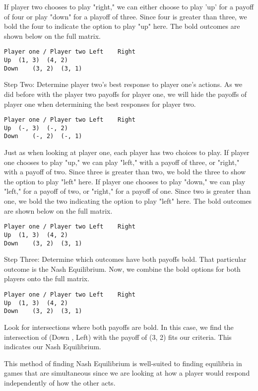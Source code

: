 \documentclass[11pt]{article} %
\begin{document}
\smallskip

If player two chooses to play "right," we can either choose to play 'up' for a payoff of four or play "down" for a playoff of three. Since four is greater than three, we bold the four to indicate the option to play "up" here. The bold outcomes are shown below on the full matrix.
\begin{verbatim}
Player one / Player two	Left	Right
Up	(1, 3)	(4, 2)
Down	(3, 2)	(3, 1)
\end{verbatim}
Step Two: Determine player two's best response to player one's actions.
As we did before with the player two payoffs for player one, we will hide the payoffs of player one when determining the best responses for player two. 
\begin{verbatim}
Player one / Player two	Left	Right
Up	(-, 3)	(-, 2)
Down	(-, 2)	(-, 1)
\end{verbatim}
Just as when looking at player one, each player has two choices to play. If player one chooses to play "up," we can play "left," with a payoff of three, or "right," with a payoff of two. Since three is greater than two, we bold the three to show the option to play "left" here. If player one chooses to play "down," we can play "left," for a payoff of two, or "right," for a payoff of one. Since two is greater than one, we bold the two indicating the option to play "left" here. The bold outcomes are shown below on the full matrix.
\begin{verbatim}
Player one / Player two	Left	Right
Up	(1, 3)	(4, 2)
Down	(3, 2)	(3, 1)
\end{verbatim}
Step Three: Determine which outcomes have both payoffs bold. That particular outcome is the Nash Equilibrium.
Now, we combine the bold options for both players onto the full matrix.

\begin{verbatim}
Player one / Player two	Left	Right
Up	(1, 3)	(4, 2)
Down	(3, 2)	(3, 1)
\end{verbatim}


Look for intersections where both payoffs are bold. In this case, we find the intersection of (Down , Left) with the payoff of (3, 2) fits our criteria. This indicates our Nash Equilibrium.

This method of finding Nash Equilibrium is well-suited to finding equilibria in games that are simultaneous since we are looking at how a player would respond independently of how the other acts. 
\end{document}
